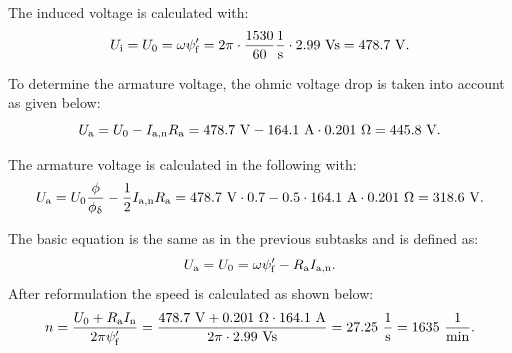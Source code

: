     
\begin{solutionblock}
    The induced voltage is calculated with:
    \begin{equation}
        \Ui = U_{\mathrm{0}}
        = \omega \psi_{\mathrm{f}}'
        = 2 \pi \cdot \frac{1530}{60} \si{\frac{1}{s}} \cdot 2.99 \ \si{Vs}
        = 478.7 \ \si{V}.
    \end{equation}

    To determine the armature voltage, the ohmic voltage drop is taken into account as given below: 
    \begin{equation}
        U_{\mathrm{a}} = U_{\mathrm{0}} - I_{\mathrm{a,n}} \Ra
        = 478.7 \ \si{V} - 164.1 \ \si{A} \cdot 0.201 \ \si{\Omega}
        = 445.8 \ \si{V}.
    \end{equation}
\end{solutionblock}




\begin{solutionblock}
    The armature voltage is calculated in the following with:
    \begin{equation}
        U_{\mathrm{a}} = U_{\mathrm{0}} \frac{\phi}{\phiDelta} - \frac{1}{2} I_{\mathrm{a,n}} \Ra
        = 478.7 \ \si{V} \cdot 0.7 - 0.5 \cdot 164.1 \ \si{A} \cdot 0.201 \ \si{\Omega}
        = 318.6 \ \si{V}.
    \end{equation}
\end{solutionblock}


\begin{solutionblock}
    The basic equation is the same as in the previous subtasks and is defined as:
    \begin{equation}
        \Ua = U_{\mathrm{0}} = \omega \psi_{\mathrm{f}}' - \Ra I_{\mathrm{a,n}}.
    \end{equation}
    After reformulation the speed is calculated as shown below:
    \begin{equation}
        n = \frac{U_{\mathrm{0}} + \Ra \In}{2 \pi \psi_{\mathrm{f}}'}
        = \frac{478.7 \ \si{V} + 0.201 \ \si{\Omega} \cdot 164.1 \ \si{A}}{2 \pi \cdot 2.99 \ \si{Vs}}
        = 27.25 \ \si{\frac{1}{s}}
        = 1635 \ \si{\frac{1}{min}}.
    \end{equation}
\end{solutionblock}
